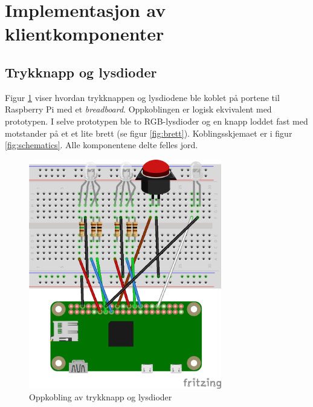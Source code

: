 \section{Implementasjon av klientkomponenter}

\subsection{Trykknapp og lysdioder}
Figur \ref{fig:breadboard} viser hvordan trykknappen og lysdiodene ble koblet på
portene til Raspberry Pi med et \textit{breadboard}. Oppkoblingen er logisk ekvivalent med prototypen.
I selve prototypen ble to RGB-lysdioder og en knapp loddet fast med motstander på et et lite brett (se figur \ref{fig:brett}).
Koblingsskjemaet er i figur \ref{fig:schematics}. Alle komponentene delte felles jord.

\begin{figure}
\includegraphics[width=0.75\textwidth, center]{fig/prototype/breadbord}
\caption{Oppkobling av trykknapp og lysdioder}
\label{fig:breadboard}
\end{figure}

